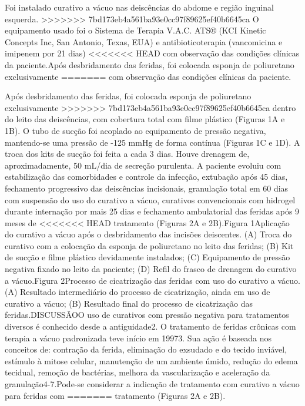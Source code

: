 \documentclass[numberinsection,times,10pt,spreadimages]{memoir}
\begin{document}
Foi instalado curativo a vácuo nas deiscências do abdome e região inguinal
esquerda.
>>>>>>> 7bd173eb4a561ba93e0cc97f89625ef40b6645ca
O equipamento usado foi o Sistema de Terapia V.A.C. ATS® (KCI Kinetic Concepts
Inc,
San Antonio, Texas, EUA) e antibioticoterapia (vancomicina e imipenem por 21
dias)
<<<<<<< HEAD
com observação das condições clínicas da paciente.Após desbridamento das
feridas, foi colocada esponja de poliuretano exclusivamente
=======
com observação das condições clínicas da paciente.

Após desbridamento das feridas, foi colocada esponja de poliuretano
exclusivamente
>>>>>>> 7bd173eb4a561ba93e0cc97f89625ef40b6645ca
dentro do leito das deiscências, com cobertura total com filme plástico (Figuras
1A e 1B). O tubo de sucção foi acoplado ao equipamento de pressão negativa,
mantendo-se uma pressão de -125 mmHg de forma contínua (Figuras 1C e 1D). A
troca dos kits de sucção foi feita a cada 3 dias. Houve drenagem de,
aproximadamente, 50 mL/dia de secreção purulenta. A paciente evoluiu com
estabilização das comorbidades e controle da infecção, extubação após 45 dias,
fechamento progressivo das deiscências incisionais, granulação total em 60 dias
com
suspensão do uso do curativo a vácuo, curativos convencionais com hidrogel
durante
internação por mais 25 dias e fechamento ambulatorial das feridas após 9 meses
de
<<<<<<< HEAD
tratamento (Figuras 2A e 2B).Figura 1Aplicação do curativo a vácuo após o
desbridamento das incisões
deiscentes. (A) Troca do curativo com a colocação da esponja de poliuretano
no leito das feridas; (B) Kit de sucção e filme plástico devidamente
instalados; (C) Equipamento de pressão negativa fixado no leito da paciente;
(D) Refil do frasco de drenagem do curativo a vácuo.Figura 2Processo de
cicatrização das feridas com uso do curativo a vácuo. (A)
Resultado intermediário do processo de cicatrização, ainda em uso de
curativo a vácuo; (B) Resultado final do processo de cicatrização das
feridas.DISCUSSÃOO uso de curativos com pressão negativa para tratamentos
diversos é conhecido desde a
antiguidade2. O tratamento de
feridas crônicas com terapia a vácuo padronizada teve início em 19973. Sua ação
é baseada nos conceitos
de: contração da ferida, eliminação do exsudado e do tecido inviável, estímulo à
mitose celular, manutenção de um ambiente úmido, redução do edema tecidual,
remoção
de bactérias, melhora da vascularização e aceleração da granulação4-7.Pode-se
considerar a indicação de tratamento com curativo a vácuo para feridas com
=======
tratamento (Figuras 2A e 2B).
\end{document}
